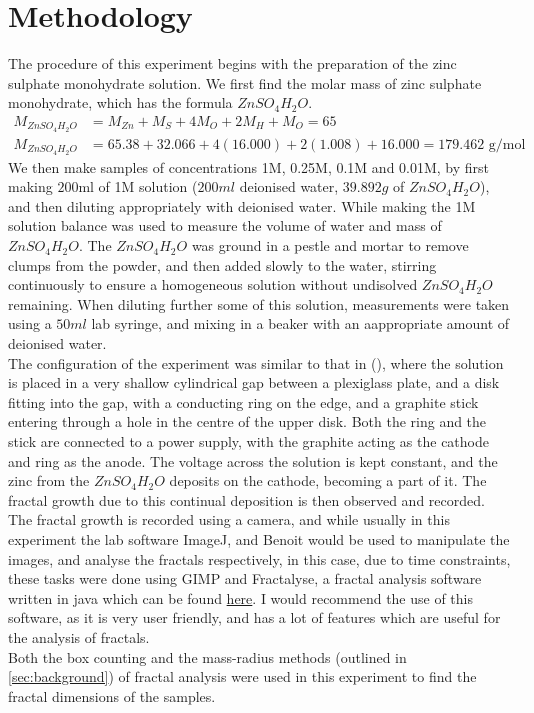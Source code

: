 \documentclass{article}
\theoremstyle{definition}
\theoremstyle{remark}
\begin{document}
\section{Methodology}\label{sec:methodology}
The procedure of this experiment begins with the preparation of the zinc sulphate monohydrate solution. We first find the molar mass of zinc sulphate monohydrate, which has the formula $ZnSO_4H_2O$.
\begin{align*}
        M_{ZnSO_4H_2O} &= M_{Zn} + M_{S} + 4M_{O} + 2M_{H} + M_{O} = 65\\
        M_{ZnSO_4H_2O} &= 65.38 + 32.066 + 4(16.000) + 2(1.008) + 16.000 = 179.462\text{ g/mol}
\end{align*}
We then make samples of concentrations 1M, 0.25M, 0.1M and 0.01M, by first making $200$ml of 1M solution ($200ml$ deionised water, $39.892g$ of $ZnSO_4H_2O$), and then diluting appropriately with deionised water.
\indent While making the 1M solution balance was used to measure the volume of water and mass of $ZnSO_4H_2O$. The $ZnSO_4H_2O$ was ground in a pestle and mortar to remove clumps from the powder, and then added slowly to the water, stirring continuously to ensure a homogeneous solution without undisolved $ZnSO_4H_2O$ remaining. When diluting further some of this solution, measurements were taken using a $50ml$ lab syringe, and mixing in a beaker with an aappropriate amount of deionised water.\\
\indent The configuration of the experiment was similar to that in (\cite{PhysRevLett.56.1260}), where the solution is placed in a very shallow cylindrical gap between a plexiglass plate, and a disk fitting into the gap, with a conducting ring on the edge, and a graphite stick entering through a hole in the centre of the upper disk. Both the ring and the stick are connected to a power supply, with the graphite acting as the cathode and ring as the anode. The voltage across the solution is kept constant, and the zinc from the $ZnSO_4H_2O$ deposits on the cathode, becoming a part of it. The fractal growth due to this continual deposition is then observed and recorded.\\
\indent The fractal growth is recorded using a camera, and while usually in this experiment the lab software ImageJ, and Benoit would be used to manipulate the images, and analyse the fractals respectively, in this case, due to time constraints, these tasks were done using GIMP and Fractalyse, a fractal analysis software written in java which can be found \href{https://sourcesup.renater.fr/www/fractalyse/}{here}. I would recommend the use of this software, as it is very user friendly, and has a lot of features which are useful for the analysis of fractals.\\
\indent Both the box counting and the mass-radius methods (outlined in \ref{sec:background}) of fractal analysis were used in this experiment to find the fractal dimensions of the samples.
\end{document}
